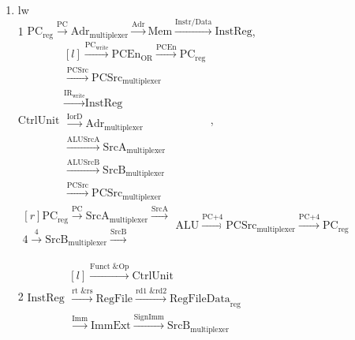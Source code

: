 \documentclass{article}
\begin{document}
\begin{enumerate}
\begin{enumerate}
\bigbreak

4 $\begin{matrix*}[r] \text{ALU}_\text{reg} \xrightarrow{\text{ALUOut}} \text{Adr}_\text{multiplexer} \xrightarrow{\text{DAdr}} \\ \text{RegFileData}_\text{reg} \xrightarrow{\text{B}} \end{matrix*} \text{Mem}$, $\text{CtrlUnit} \begin{matrix*}[l] 
\xrightarrow{\text{IorD}} \text{Adr}_\text{multiplexer} \\ \xrightarrow{\text{MemWrite}} \text{Mem} \end{matrix*}$

\bigbreak

    \item lw\\
1 $\text{PC}_\text{reg} \xrightarrow{\text{PC}} \text{Adr}_\text{multiplexer} \xrightarrow{\text{Adr}} \text{Mem} \xrightarrow{\text{Instr/Data}} \text{InstReg}$, $\text{CtrlUnit} \begin{matrix*}[l] 
\xrightarrow{\text{PC}_\text{write}} \text{PCEn}_\text{OR} \xrightarrow{\text{PCEn}} \text{PC}_\text{reg} \\ 
\xrightarrow{\text{PCSrc}} \text{PCSrc}_\text{multiplexer} \\
\xrightarrow{\text{IR}_\text{write}} \text{InstReg} \\
\xrightarrow{\text{IorD}} \text{Adr}_\text{multiplexer} \\ \xrightarrow{\text{ALUSrcA}} \text{SrcA}_\text{multiplexer} \\ \xrightarrow{\text{ALUSrcB}} \text{SrcB}_\text{multiplexer} \\ \xrightarrow{\text{PCSrc}} \text{PCSrc}_\text{multiplexer} \end{matrix*}$,\\ $\begin{matrix*}[r] \text{PC}_\text{reg} \xrightarrow{\text{PC}} \text{SrcA}_\text{multiplexer} \xrightarrow{\text{SrcA}} \\ \text{4} \xrightarrow{\text{4}} \text{SrcB}_\text{multiplexer} \xrightarrow{\text{SrcB}}\end{matrix*} \text{ALU} \xrightarrow{\text{PC+4}} \text{PCSrc}_\text{multiplexer} \xrightarrow{\text{PC+4}} \text{PC}_\text{reg}$\\

\bigbreak

2 $\text{InstReg} \begin{matrix*}[l] 
\xrightarrow{\text{Funct \& Op}} \text{CtrlUnit} \\ \xrightarrow{\text{rt \& rs}} \text{RegFile} \xrightarrow{\text{rd1 \& rd2}} \text{RegFileData}_\text{reg} \\
\xrightarrow{\text{Imm}} \text{ImmExt} \xrightarrow{\text{SignImm}} \text{SrcB}_\text{multiplexer} \end{matrix*}$\\


\end{enumerate}
\end{enumerate}
\end{document}
